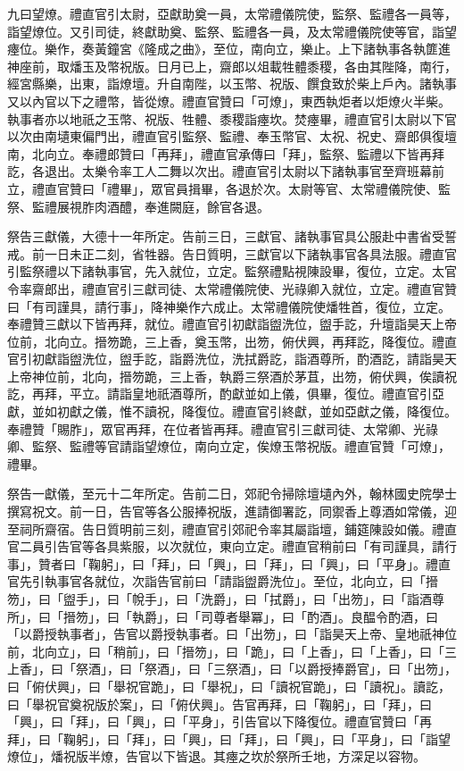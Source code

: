 \begin{pinyinscope}
 九曰望燎。禮直官引太尉，亞獻助奠一員，太常禮儀院使，監祭、監禮各一員等，詣望燎位。又引司徒，終獻助奠、監祭、監禮各一員，及太常禮儀院使等官，詣望瘞位。樂作，奏黃鐘宮《隆成之曲》，至位，南向立，樂止。上下諸執事各執篚進神座前，取燔玉及幣祝版。日月已上，齋郎以俎載牲體黍稷，各由其陛降，南行，經宮縣樂，出東，詣燎壇。升自南陛，以玉幣、祝版、饌食致於柴上戶內。諸執事又以內官以下之禮幣，皆從燎。禮直官贊曰「可燎」，東西執炬者以炬燎火半柴。執事者亦以地祇之玉幣、祝版、牲體、黍稷詣瘞坎。焚瘞畢，禮直官引太尉以下官以次由南壝東偏門出，禮直官引監祭、監禮、奉玉幣官、太祝、祝史、齋郎俱復壇南，北向立。奉禮郎贊曰「再拜」，禮直官承傳曰「拜」，監祭、監禮以下皆再拜訖，各退出。太樂令率工人二舞以次出。禮直官引太尉以下諸執事官至齊班幕前立，禮直官贊曰「禮畢」，眾官員揖畢，各退於次。太尉等官、太常禮儀院使、監祭、監禮展視胙肉酒醴，奉進闕庭，餘官各退。



 祭告三獻儀，大德十一年所定。告前三日，三獻官、諸執事官具公服赴中書省受誓戒。前一日未正二刻，省牲器。告日質明，三獻官以下諸執事官各具法服。禮直官引監祭禮以下諸執事官，先入就位，立定。監祭禮點視陳設畢，復位，立定。太官令率齋郎出，禮直官引三獻司徒、太常禮儀院使、光祿卿入就位，立定。禮直官贊曰「有司謹具，請行事」，降神樂作六成止。太常禮儀院使燔牲首，復位，立定。奉禮贊三獻以下皆再拜，就位。禮直官引初獻詣盥洗位，盥手訖，升壇詣昊天上帝位前，北向立。搢笏跪，三上香，奠玉幣，出笏，俯伏興，再拜訖，降復位。禮直官引初獻詣盥洗位，盥手訖，詣爵洗位，洗拭爵訖，詣酒尊所，酌酒訖，請詣昊天上帝神位前，北向，搢笏跪，三上香，執爵三祭酒於茅苴，出笏，俯伏興，俟讀祝訖，再拜，平立。請詣皇地祇酒尊所，酌獻並如上儀，俱畢，復位。禮直官引亞獻，並如初獻之儀，惟不讀祝，降復位。禮直官引終獻，並如亞獻之儀，降復位。奉禮贊「賜胙」，眾官再拜，在位者皆再拜。禮直官引三獻司徒、太常卿、光祿卿、監祭、監禮等官請詣望燎位，南向立定，俟燎玉幣祝版。禮直官贊「可燎」，禮畢。



 祭告一獻儀，至元十二年所定。告前二日，郊祀令掃除壇壝內外，翰林國史院學士撰寫祝文。前一日，告官等各公服捧祝版，進請御署訖，同禦香上尊酒如常儀，迎至祠所齋宿。告日質明前三刻，禮直官引郊祀令率其屬詣壇，鋪筵陳設如儀。禮直官二員引告官等各具紫服，以次就位，東向立定。禮直官稍前曰「有司謹具，請行事」，贊者曰「鞠躬」，曰「拜」，曰「興」，曰「拜」，曰「興」，曰「平身」。禮直官先引執事官各就位，次詣告官前曰「請詣盥爵洗位」。至位，北向立，曰「搢笏」，曰「盥手」，曰「帨手」，曰「洗爵」，曰「拭爵」，曰「出笏」，曰「詣酒尊所」，曰「搢笏」，曰「執爵」，曰「司尊者舉冪」，曰「酌酒」。良醖令酌酒，曰「以爵授執事者」，告官以爵授執事者。曰「出笏」，曰「詣昊天上帝、皇地祇神位前，北向立」，曰「稍前」，曰「搢笏」，曰「跪」，曰「上香」，曰「上香」，曰「三上香」，曰「祭酒」，曰「祭酒」，曰「三祭酒」，曰「以爵授捧爵官」，曰「出笏」，曰「俯伏興」，曰「舉祝官跪」，曰「舉祝」，曰「讀祝官跪」，曰「讀祝」。讀訖，曰「舉祝官奠祝版於案」，曰「俯伏興」。告官再拜，曰「鞠躬」，曰「拜」，曰「興」，曰「拜」，曰「興」，曰「平身」，引告官以下降復位。禮直官贊曰「再拜」，曰「鞠躬」，曰「拜」，曰「興」，曰「拜」，曰「興」，曰「平身」，曰「詣望燎位」，燔祝版半燎，告官以下皆退。其瘞之坎於祭所壬地，方深足以容物。



\end{pinyinscope}
